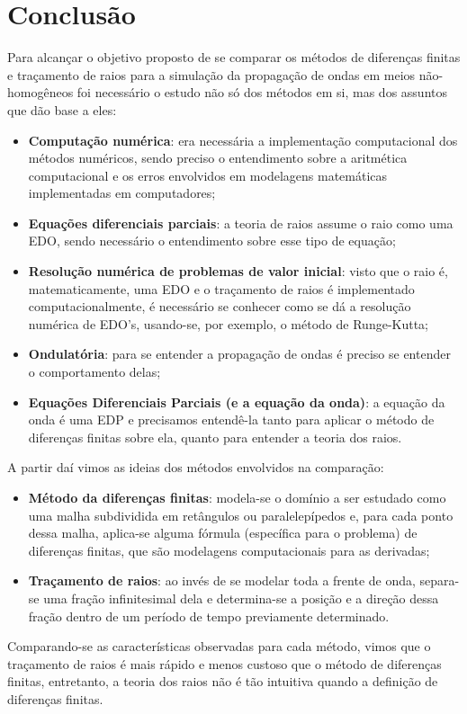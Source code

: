 \chapter{Conclusão}

    \label{cap:concl}
    
    Para alcançar o objetivo proposto de se comparar os métodos de diferenças finitas e traçamento de raios para a simulação da propagação de ondas em meios não-homogêneos foi necessário o estudo não só dos métodos em si, mas dos assuntos que dão base a eles:
    \begin{itemize}
        \item \textbf{Computação numérica}: era necessária a implementação computacional dos métodos numéricos, sendo preciso o entendimento sobre a aritmética computacional e os erros envolvidos em modelagens matemáticas implementadas em computadores;
        \item \textbf{Equações diferenciais parciais}: a teoria de raios assume o raio como uma EDO, sendo necessário o entendimento sobre esse tipo de equação;
        \item \textbf{Resolução numérica de problemas de valor inicial}: visto que o raio é, matematicamente, uma EDO e o traçamento de raios é implementado computacionalmente, é necessário se conhecer como se dá a resolução numérica de EDO's, usando-se, por exemplo, o método de Runge-Kutta;
        \item \textbf{Ondulatória}: para se entender a propagação de ondas é preciso se entender o comportamento delas;
        \item \textbf{Equações Diferenciais Parciais (e a equação da onda)}: a equação da onda é uma EDP e precisamos entendê-la tanto para aplicar o método de diferenças finitas sobre ela, quanto para entender a teoria dos raios.
    \end{itemize}
    
    A partir daí vimos as ideias dos métodos envolvidos na comparação:
    \begin{itemize}
        \item \textbf{Método da diferenças finitas}: modela-se o domínio a ser estudado como uma malha subdividida em retângulos ou paralelepípedos e, para cada ponto dessa malha, aplica-se alguma fórmula (específica para o problema) de diferenças finitas, que são modelagens computacionais para as derivadas;
        \item \textbf{Traçamento de raios}: ao invés de se modelar toda a frente de onda, separa-se uma fração infinitesimal dela e determina-se a posição e a direção dessa fração dentro de um período de tempo previamente determinado.
    \end{itemize}
    Comparando-se as características observadas para cada método, vimos que o traçamento de raios é mais rápido e menos custoso que o método de diferenças finitas, entretanto, a teoria dos raios não é tão intuitiva quando a definição de diferenças finitas.
    
